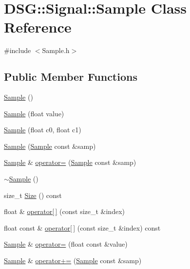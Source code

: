 \hypertarget{classDSG_1_1Signal_1_1Sample}{\section{D\+S\+G\+:\+:Signal\+:\+:Sample Class Reference}
\label{classDSG_1_1Signal_1_1Sample}
}


{\ttfamily \#include $<$Sample.\+h$>$}

\subsection*{Public Member Functions}
\begin{DoxyCompactItemize}
\item 
\hyperlink{classDSG_1_1Signal_1_1Sample_a21db6fade3ee3554ed3887cb2b74daff}{Sample} ()
\item 
\hyperlink{classDSG_1_1Signal_1_1Sample_af7d966312f07a8e29fdf981eb98425c7}{Sample} (float value)
\item 
\hyperlink{classDSG_1_1Signal_1_1Sample_aa35d8b0de9970a98a239163ce55fc1e5}{Sample} (float c0, float c1)
\item 
\hyperlink{classDSG_1_1Signal_1_1Sample_a50ccdc13979982a1d846eec6b2c2ab3a}{Sample} (\hyperlink{classDSG_1_1Signal_1_1Sample}{Sample} const \&samp)
\item 
\hyperlink{classDSG_1_1Signal_1_1Sample}{Sample} \& \hyperlink{classDSG_1_1Signal_1_1Sample_aa6bf62f7afdfca9c9026cdbadc180526}{operator=} (\hyperlink{classDSG_1_1Signal_1_1Sample}{Sample} const \&samp)
\item 
\hyperlink{classDSG_1_1Signal_1_1Sample_a56f4acc6fd2ae47319e68444cf788955}{$\sim$\+Sample} ()
\item 
size\+\_\+t \hyperlink{classDSG_1_1Signal_1_1Sample_a4b7584430c5c447d502999254fc32dbb}{Size} () const 
\item 
float \& \hyperlink{classDSG_1_1Signal_1_1Sample_ac952b26f862f266cd799443e82162c21}{operator\mbox{[}$\,$\mbox{]}} (const size\+\_\+t \&index)
\item 
float const \& \hyperlink{classDSG_1_1Signal_1_1Sample_ab3a511d8a5775f36ebf706d96e4bd578}{operator\mbox{[}$\,$\mbox{]}} (const size\+\_\+t \&index) const 
\item 
\hyperlink{classDSG_1_1Signal_1_1Sample}{Sample} \& \hyperlink{classDSG_1_1Signal_1_1Sample_a354bbf045d92329f52cc39e43ded801a}{operator=} (float const \&value)
\item 
\hyperlink{classDSG_1_1Signal_1_1Sample}{Sample} \& \hyperlink{classDSG_1_1Signal_1_1Sample_a5afa0ca79f97611dcc514050463903e6}{operator+=} (\hyperlink{classDSG_1_1Signal_1_1Sample}{Sample} const \&samp)

\end{DoxyCompactItemize}
